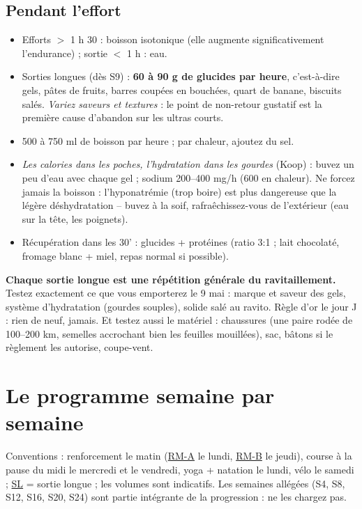 \documentclass[10pt,a4paper]{article}
\newcommand{\rma}{\hyperlink{rm-a}{RM-A}}
\newcommand{\rmb}{\hyperlink{rm-b}{RM-B}}
\newcommand{\sln}{\hyperlink{legende}{SL}}
\begin{document}
\subsection{Pendant l'effort}
\begin{itemize}
\item Efforts $>$ 1 h 30 : boisson isotonique (elle augmente
significativement l'endurance) ; sortie $<$ 1 h : eau.
\item Sorties longues (d\`es S9) : \textbf{60 \`a 90 g de glucides par heure},
c'est-à-dire gels, p\^ates de fruits, barres coup\'ees en bouch\'ees, quart de
banane, biscuits sal\'es. \emph{Variez saveurs et textures} : le point de
non-retour gustatif est la premi\`ere cause d'abandon sur les ultras courts.
\item 500 \`a 750 ml de boisson par heure ; par chaleur, ajoutez du sel.
\item \emph{Les calories dans les poches, l'hydratation dans les gourdes}
(Koop) : buvez un peu d'eau avec chaque gel ; sodium 200--400 mg/h (600
en chaleur). Ne forcez jamais la boisson : l'hyponatr\'emie (trop boire)
est plus dangereuse que la l\'eg\`ere d\'eshydratation -- buvez \`a la soif,
rafra\^echissez-vous de l'ext\'erieur (eau sur la t\^ete, les poignets).
\item R\'ecup\'eration dans les 30' : glucides + prot\'eines (ratio 3:1 ;
lait chocolat\'e, fromage blanc + miel, repas normal si possible).
\end{itemize}

\begin{aret}
\textbf{Chaque sortie longue est une r\'ep\'etition g\'en\'erale du
ravitaillement.} Testez exactement ce que vous emporterez le 9 mai : marque
et saveur des gels, syst\`eme d'hydratation (gourdes souples), solide sal\'e
au ravito. R\`egle d'or le jour J : rien de neuf, jamais. Et testez aussi le
mat\'eriel : chaussures (une paire rod\'ee de 100--200 km, semelles accrochant
bien les feuilles mouill\'ees), sac, b\^atons si le r\`eglement les autorise,
coupe-vent.
\end{aret}

\clearpage
\section{Le programme semaine par semaine}

Conventions : renforcement le matin (\rma{} le lundi, \rmb{} le jeudi),
course \`a la pause du midi le mercredi et le vendredi, yoga + natation le
lundi, v\'elo le samedi ; \sln{} = sortie longue ; les volumes sont
indicatifs. Les semaines all\'eg\'ees (S4, S8, S12, S16, S20, S24) sont
partie int\'egrante de la progression : ne les chargez pas.
\end{document}

